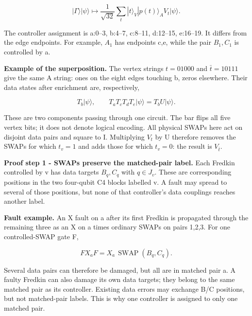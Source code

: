\documentclass[11pt]{article}
\begin{document}
\[
|\Gamma\rangle|\psi\rangle
\longmapsto
\frac1{\sqrt{32}}\sum_t |t\rangle_V|p(t)\rangle_A V_t|\psi\rangle.
\]

\begin{center}\begin{minipage}{\linewidth}

\end{minipage}\end{center}

The controller assignment is a:0--3, b:4--7, c:8--11, d:12--15, e:16--19. It differs from the edge endpoints. For example, \(A_1\) has endpoints c,e, while the pair \(B_1,C_1\) is controlled by a.

\textbf{Example of the superposition.} The vertex strings \(t=01000\) and \(\bar t=10111\) give the same A string: ones on the eight edges touching b, zeros elsewhere. Their data states after enrichment are, respectively,

\[
T_b|\psi\rangle,\qquad T_aT_cT_dT_e|\psi\rangle=T_bU|\psi\rangle.
\]

These are two components passing through one circuit. The bar flips all five vertex bits; it does not denote logical encoding. All physical SWAPs here act on disjoint data pairs and square to I. Multiplying \(V_t\) by U therefore removes the SWAPs for which \(t_v=1\) and adds those for which \(t_v=0\): the result is \(V_{\bar t}\).

\textbf{Proof step 1 - SWAPs preserve the matched-pair label.} Each Fredkin controlled by v has data targets \(B_q,C_q\) with \(q\in J_v\). These are corresponding positions in the two four-qubit C4 blocks labelled v. A fault may spread to several of those positions, but none of that controller's data couplings reaches another label.

\textbf{Fault example.} An X fault on a after its first Fredkin is propagated through the remaining three as an X on a times ordinary SWAPs on pairs 1,2,3. For one controlled-SWAP gate F,

\[
F X_a F=X_a\,\operatorname{SWAP}(B_q,C_q).
\]

Several data pairs can therefore be damaged, but all are in matched pair a. A faulty Fredkin can also damage its own data targets; they belong to the same matched pair as its controller. Existing data errors may exchange B/C positions, but not matched-pair labels. This is why one controller is assigned to only one matched pair.
\end{document}
